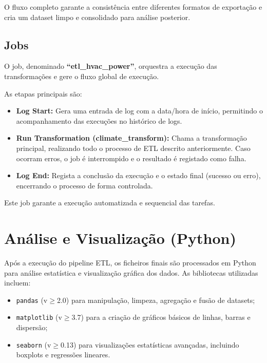 \documentclass[a4paper, 12pt]{article} %
\begin{document}
O fluxo completo garante a consistência entre diferentes formatos de exportação e cria um dataset limpo e consolidado para análise posterior.

\subsection{Jobs}

O job, denominado \textbf{``etl\_hvac\_power''}, orquestra a execução das transformações e gere o fluxo global de execução.

As etapas principais são:

\begin{itemize}
	\item \textbf{Log Start:}  
	Gera uma entrada de log com a data/hora de início, permitindo o acompanhamento das execuções no histórico de logs.
	
	\item \textbf{Run Transformation (climate\_transform):}  
	Chama a transformação principal, realizando todo o processo de ETL descrito anteriormente.  
	Caso ocorram erros, o job é interrompido e o resultado é registado como falha.
	
	\item \textbf{Log End:}  
	Regista a conclusão da execução e o estado final (sucesso ou erro), encerrando o processo de forma controlada.
\end{itemize}

Este job garante a execução automatizada e sequencial das tarefas.


\newpage
\section{Análise e Visualização (Python)}

Após a execução do pipeline ETL, os ficheiros finais são processados em Python para análise estatística e visualização gráfica dos dados.  
As bibliotecas utilizadas incluem:

\begin{itemize}
	\item \texttt{pandas} (v$\geq$2.0) para manipulação, limpeza, agregação e fusão de datasets;
	\item \texttt{matplotlib} (v$\geq$3.7) para a criação de gráficos básicos de linhas, barras e dispersão;
	\item \texttt{seaborn} (v$\geq$0.13) para visualizações estatísticas avançadas, incluindo boxplots e regressões lineares.
\end{itemize}
\end{document}

